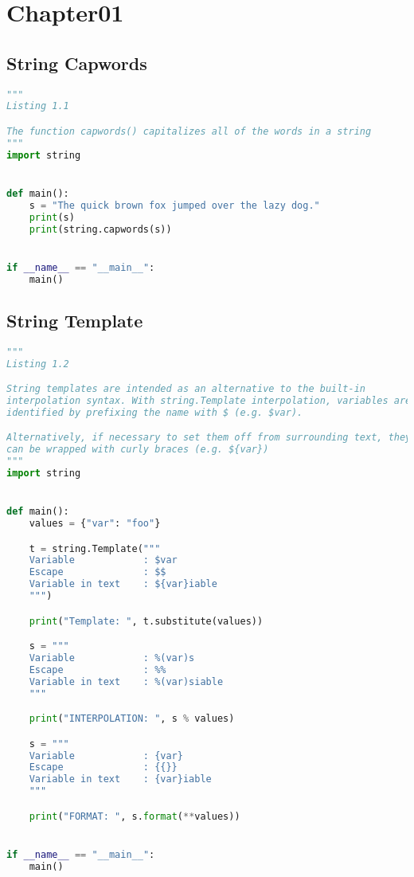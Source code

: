 \documentclass[a4paper,landscape]{report}
\begin{document}
\tableofcontents{}
\chapter{Chapter01}
\section{String Capwords}
\begin{lstlisting}[language=Python]
"""
Listing 1.1

The function capwords() capitalizes all of the words in a string
"""
import string


def main():
    s = "The quick brown fox jumped over the lazy dog."
    print(s)
    print(string.capwords(s))


if __name__ == "__main__":
    main()

\end{lstlisting}
\section{String Template}
\begin{lstlisting}[language=Python]
"""
Listing 1.2

String templates are intended as an alternative to the built-in
interpolation syntax. With string.Template interpolation, variables are
identified by prefixing the name with $ (e.g. $var).

Alternatively, if necessary to set them off from surrounding text, they
can be wrapped with curly braces (e.g. ${var})
"""
import string


def main():
    values = {"var": "foo"}

    t = string.Template("""
    Variable            : $var
    Escape              : $$
    Variable in text    : ${var}iable
    """)

    print("Template: ", t.substitute(values))

    s = """
    Variable            : %(var)s
    Escape              : %%
    Variable in text    : %(var)siable
    """

    print("INTERPOLATION: ", s % values)

    s = """
    Variable            : {var}
    Escape              : {{}}
    Variable in text    : {var}iable
    """

    print("FORMAT: ", s.format(**values))


if __name__ == "__main__":
    main()

\end{lstlisting}
\end{document}
